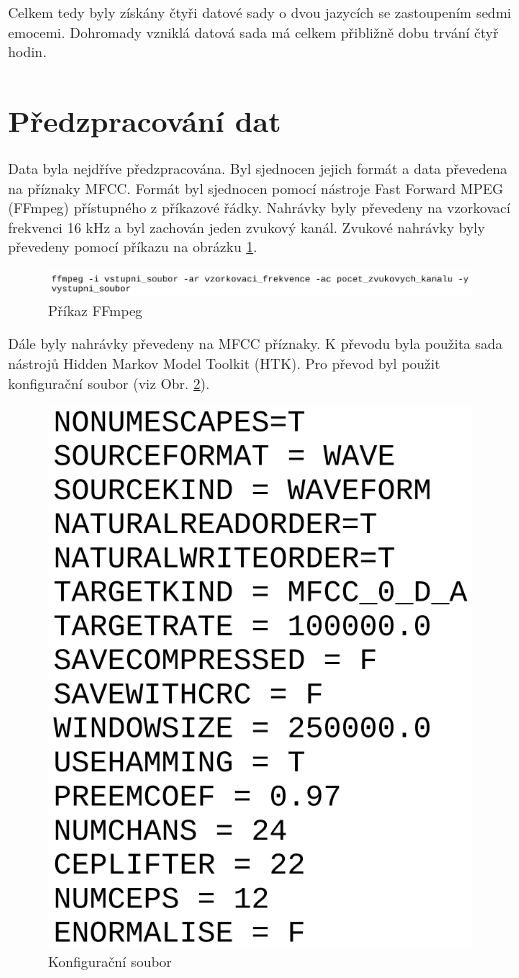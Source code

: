 \documentclass[FM,BP]{tulthesis}
\begin{document}
Celkem tedy byly získány čtyři datové sady o dvou jazycích se zastoupením sedmi emocemi. Dohromady vzniklá datová sada má celkem přibližně dobu trvání čtyř hodin.

\section{Předzpracování dat} %
Data byla nejdříve předzpracována. Byl sjednocen jejich formát a data převedena na příznaky MFCC. Formát byl sjednocen pomocí nástroje Fast Forward MPEG (FFmpeg) přístupného z příkazové řádky. Nahrávky byly převedeny na vzorkovací frekvenci 16 kHz a byl zachován jeden zvukový kanál. Zvukové nahrávky byly převedeny pomocí příkazu na obrázku \ref{fig:ffmpeg}.

\begin{figure}[htbp]
\centerline{\includegraphics[width=\textwidth,height=\textheight,keepaspectratio]{ffmpeg_command.png}}
\caption{Příkaz FFmpeg}
\label{fig:ffmpeg}
\end{figure}
\FloatBarrier

Dále byly nahrávky převedeny na MFCC příznaky. K převodu byla použita sada nástrojů Hidden Markov Model Toolkit (HTK). Pro převod byl použit konfigurační soubor (viz Obr. \ref{fig:htk_config}).

\begin{figure}[htbp]
\centerline{\includegraphics[scale=.2,keepaspectratio]{htk_config.png}}
\caption{Konfigurační soubor}
\label{fig:htk_config}
\end{figure}
\FloatBarrier
\end{document}

